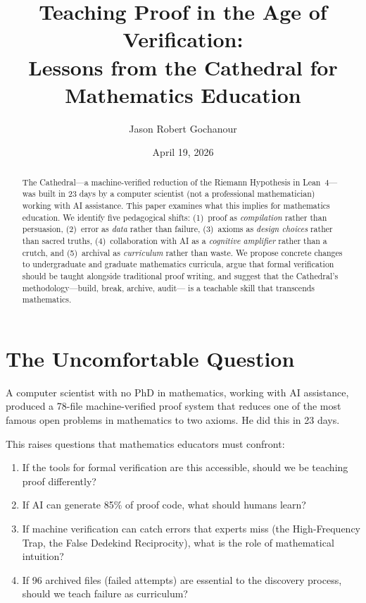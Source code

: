 \documentclass[11pt,a4paper]{article}
\title{%
  Teaching Proof in the Age of Verification:\\
  Lessons from the Cathedral for Mathematics Education%
}
\author{
  Jason Robert Gochanour
}
\date{April 19, 2026}
\begin{document}
\maketitle

\begin{abstract}
The Cathedral---a machine-verified reduction of the Riemann Hypothesis
in Lean~4---was built in 23 days by a computer scientist (not a
professional mathematician) working with AI assistance. This paper
examines what this implies for mathematics education. We identify
five pedagogical shifts: (1)~proof as \emph{compilation} rather than
persuasion, (2)~error as \emph{data} rather than failure,
(3)~axioms as \emph{design choices} rather than sacred truths,
(4)~collaboration with AI as a \emph{cognitive amplifier} rather
than a crutch, and (5)~archival as \emph{curriculum} rather
than waste. We propose concrete changes to undergraduate and
graduate mathematics curricula, argue that formal verification
should be taught alongside traditional proof writing, and suggest
that the Cathedral's methodology---build, break, archive, audit---
is a teachable skill that transcends mathematics.
\end{abstract}

\tableofcontents

\section{The Uncomfortable Question}

A computer scientist with no PhD in mathematics, working with AI
assistance, produced a 78-file machine-verified proof system that
reduces one of the most famous open problems in mathematics to two
axioms. He did this in 23 days.

This raises questions that mathematics educators must confront:

\begin{enumerate}
  \item If the tools for formal verification are this accessible,
    should we be teaching proof differently?
  \item If AI can generate 85\% of proof code, what should humans
    learn?
  \item If machine verification can catch errors that experts miss
    (the High-Frequency Trap, the False Dedekind Reciprocity), what
    is the role of mathematical intuition?
  \item If 96 archived files (failed attempts) are essential to the
    discovery process, should we teach failure as curriculum?
\end{enumerate}
\end{document}
